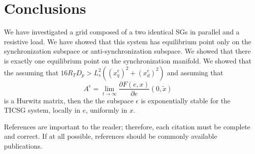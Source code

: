 \documentclass[letterpaper, 10 pt, conference]{ieeeconf}  %
\begin{document}
\section{Conclusions}

We have investigated  a grid composed of a two identical SGs in parallel and a resistive load. We have showed that this system has equilibrium point only on the synchronization subspace or anti-synchronization subspace. We showed that there is exactly one equilibrium point on the synchronization manifold. We showed that the assuming that $16 R_T D_p > L_s^2\left(\left(x_q^e\right)^2 +  \left(x_d^e\right)^2 \right)$  and assuming that 
$$ A^e = \lim_{t \to \infty} \frac{\partial F(e,x)}{\partial e}\left(0,\tilde{x}\right) $$ is a Hurwitz matrix, then the the subspace $\epsilon$ is exponentially stable for the TICSG system, locally in $e$, uniformly in $x$.

References are important to the reader; therefore, each citation must be complete and correct. If at all possible, references should be commonly available publications.
\end{document}

